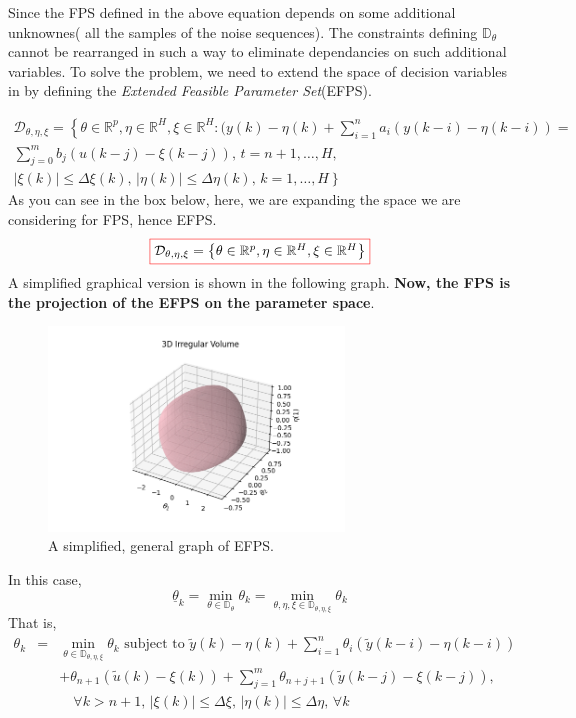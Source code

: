 Since the FPS defined in the above equation depends on some additional unknownes( all the samples of the noise sequences). The constraints defining \(\mathbb{D}_\theta\) cannot be rearranged in such a way to eliminate dependancies on such additional variables. To solve the problem, we need to extend the space of decision variables in by defining the \textit{Extended Feasible Parameter Set}(EFPS).

\[
\begin{array}{c}
\mathcal{D}_{\theta,\eta,\xi} = \left\{ \theta \in \mathbb{R}^p, \eta \in \mathbb{R}^H, \xi \in \mathbb{R}^H : \right.
(y(k) - \eta(k) + \sum_{i=1}^{n} a_i ( y(k-i) - \eta(k-i)) = \\[2ex]
\sum_{j=0}^{m} b_j ( u(k-j) - \xi(k-j) ), \, t = n+1,\dots,H, \\[2ex]
|\xi(k)| \leq \Delta \xi(k), \, |\eta(k)| \leq \Delta \eta(k), \, k = 1,\dots,H \left.\right\}
\end{array}
\]
As you can see in the box below, here, we are expanding the space we are considering for FPS, hence EFPS.
\begin{align}
\fcolorbox{red}{white}{$\mathcal{D}_{\theta,\eta,\xi} = \left\{ \theta \in \mathbb{R}^p, \eta \in \mathbb{R}^H, \xi \in \mathbb{R}^H\right\}$}
\end{align}
A simplified graphical version is shown in the following graph. \textbf{Now, the FPS is the projection of the EFPS on the parameter space}.

\begin{figure}[htbp]  %
    \centering
    \includegraphics[width=0.7\textwidth]{images/EFPS.png}
    \caption{A simplified, general graph of EFPS.}
    \label{fig:EFPS}
\end{figure}

In this case,
\[
\underline{\theta}_k = \min\limits_{\theta \in \mathbb{D}_\theta} \theta_k = \min\limits_{\theta, \eta, \xi \in \mathbb{D}_{\theta, \eta, \xi}} \theta_k
\]
That is,
\[
\begin{array}{rcl}
\theta_k & = & \min_{\theta \in \mathbb{D}_{\theta, \eta, \xi}} \theta_k \text{ subject to } \tilde{y}(k) - \eta(k) + \sum_{i=1}^{n} \theta_i(\tilde{y}(k-i) - \eta(k-i)) \\[1ex]
& & + \theta_{n+1}(\tilde{u}(k) - \xi(k)) + \sum_{j=1}^{m} \theta_{n+j+1}(\tilde{y}(k-j) - \xi(k-j)), \\[1ex]
& & \quad \forall k > n+1, \, |\xi(k)| \leq \Delta \xi, \, |\eta(k)| \leq \Delta \eta, \, \forall k
\end{array}
\]

